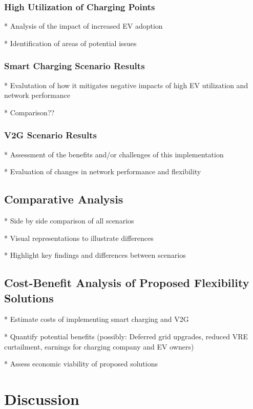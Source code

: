 \subsubsection{High Utilization of Charging Points}

* Analysis of the impact of increased EV adoption

* Identification of areas of potential issues


\subsubsection{Smart Charging Scenario Results}

* Evalutation of how it mitigates negative impacts of high EV utilization and network performance

* Comparison??

\subsubsection{V2G Scenario Results}

* Assessment of the benefits and/or challenges of this implementation

* Evaluation of changes in network performance and flexibility


\subsection{Comparative Analysis}

* Side by side comparison of all scenarios

* Visual representations to illustrate differences

* Highlight key findings and differences between scenarios


\subsection{Cost-Benefit Analysis of Proposed Flexibility Solutions}

* Estimate costs of implementing smart charging and V2G

* Quantify potential benefits (possibly: Deferred grid upgrades, reduced VRE curtailment, earnings for charging company and EV owners)

* Assess economic viability of proposed solutions


\section{Discussion}

